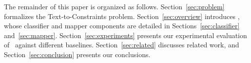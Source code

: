 The remainder of this paper is organized as follows. Section~\ref{sec:problem} formalizes the Text-to-Constraints problem. Section~\ref{sec:overview} introduces \system, whose classifier and mapper components are detailed in Sections~\ref{sec:classifier} and~\ref{sec:mapper}. Section~\ref{sec:experiments} presents our experimental evaluation of \system\ against different baselines. Section~\ref{sec:related} discusses related work, and Section~\ref{sec:conclusion} presents our conclusions.









%
%


